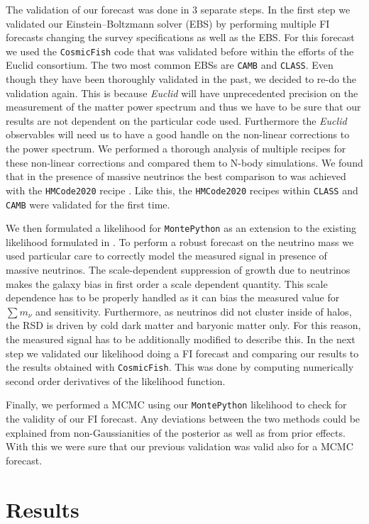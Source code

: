 \documentclass[a4paper,11pt]{article}
\newcommand{\euclid}{\textit{Euclid}\xspace}
\newcommand{\summnu}{\sum m_\nu}
\newcommand{\camb}{\texttt{CAMB}\xspace}
\newcommand{\class}{\texttt{CLASS}\xspace}
\newcommand{\montepython}{\texttt{MontePython}\xspace}
\newcommand{\cosmicfish}{\texttt{CosmicFish}\xspace}
\begin{document}
The validation of our forecast was done in 3 separate steps. In the first step we validated our Einstein--Boltzmann solver (EBS) by performing multiple FI forecasts changing the survey specifications as well as the EBS. For this forecast we used the \cosmicfish code that was validated before within the efforts of the Euclid consortium\cite{ISTF2020}. The two most common EBSs are \camb\cite{2011ascl.soft02026L} and \class\cite{Diego_Blas_2011}. Even though they have been thoroughly validated in the past, we decided to re-do the validation again. This is because \euclid will have unprecedented precision on the measurement of the matter power spectrum and thus we have to be sure that our results are not dependent on the particular code used. Furthermore the \euclid observables will need us to have a good handle on the non-linear corrections to the power spectrum. We performed a thorough analysis of multiple recipes for these non-linear corrections and compared them to N-body simulations. We found that in the presence of massive neutrinos the best comparison to was achieved with the \texttt{HMCode2020} recipe \cite{Mead_2021}. Like this, the \texttt{HMCode2020} recipes within \class and \camb were validated for the first time.

We then formulated a likelihood for \montepython\cite{Audren:2012wb} as an extension to the existing likelihood formulated in \cite{casas2023euclidvalidationmontepythonforecasting}. To perform a robust forecast on the neutrino mass we used particular care to correctly model the measured signal in presence of massive neutrinos. The scale-dependent suppression of growth due to neutrinos makes the galaxy bias in first order a scale dependent quantity. This scale dependence has to be properly handled as it can bias the measured value for $\summnu$ and sensitivity\cite{Vagnozzi_2018}. Furthermore, as neutrinos did not cluster inside of halos, the RSD is driven by cold dark matter and baryonic matter only\cite{Villaescusa_Navarro_2018}. For this reason, the measured signal has to be additionally modified to describe this. In the next step we validated our likelihood doing a FI forecast and comparing our results to the results obtained with \cosmicfish. This was done by computing numerically second order derivatives of the likelihood function.

Finally, we performed a MCMC using our \montepython likelihood to check for the validity of our FI forecast. Any deviations between the two methods could be explained from non-Gaussianities of the posterior as well as from prior effects. With this we were sure that our previous validation was valid also for a MCMC forecast.
\section{Results}



\end{document}
